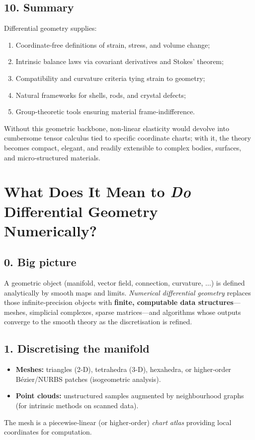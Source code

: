 \documentclass[12pt]{article}
\theoremstyle{definition} %
\theoremstyle{plain} %
\begin{document}
\subsection*{10.  Summary}
Differential geometry supplies:
\begin{enumerate}
  \item Coordinate‑free definitions of strain, stress, and volume change;
  \item Intrinsic balance laws via covariant derivatives and Stokes’ theorem;
  \item Compatibility and curvature criteria tying strain to geometry;
  \item Natural frameworks for shells, rods, and crystal defects;
  \item Group‑theoretic tools ensuring material frame‑indifference.
\end{enumerate}
Without this geometric backbone, non‑linear elasticity would devolve
into cumbersome tensor calculus tied to specific coordinate charts;
with it, the theory becomes compact, elegant, and readily extensible to
complex bodies, surfaces, and micro‑structured materials.
\section*{What Does It Mean to \emph{Do} Differential Geometry Numerically?}

\subsection*{0.  Big picture}
A geometric object (manifold, vector field, connection, curvature,
$\dots$) is defined analytically by smooth maps and limits.
\emph{Numerical differential geometry} replaces those infinite‑precision
objects with \textbf{finite, computable data structures}—meshes,
simplicial complexes, sparse matrices—and algorithms whose outputs
converge to the smooth theory as the discretisation is refined.

\subsection*{1.  Discretising the manifold}
\begin{itemize}
  \item \textbf{Meshes:} triangles (2‑D), tetrahedra (3‑D), hexahedra,
        or higher‑order Bézier/NURBS patches (isogeometric analysis).
  \item \textbf{Point clouds:} unstructured samples augmented by
        neighbourhood graphs (for intrinsic methods on scanned data).
\end{itemize}
The mesh is a piecewise‑linear (or higher‑order) \emph{chart atlas}
providing local coordinates for computation.
\end{document}

